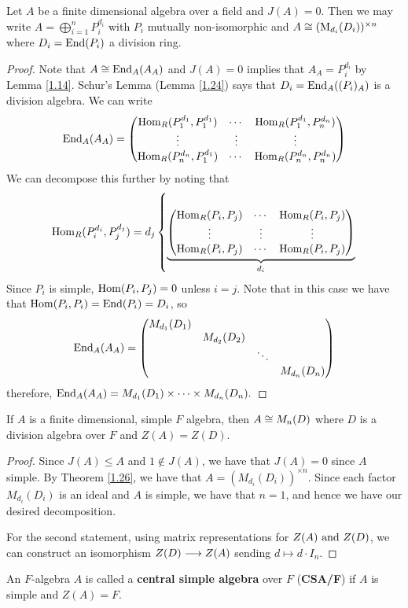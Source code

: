 \begin{theorem}\label{1.27}
Let $A$ be a finite dimensional algebra over a field and $J(A) = 0$. Then we may write $A = \bigoplus_{i=1}^n P_i^{d_i}$ with $P_i$ mutually non-isomorphic and $A \cong (\operatorname{M}_{d_i}(D_i))^{\times n}$ where $D_i = \operatorname{End} (P_i)$ a division ring.
\end{theorem}
\begin{proof}
Note that $A \cong \operatorname{End}_A(A_A)$ and $J(A) = 0$ implies that $A_A = P_i^{d_i}$ by Lemma \ref{1.14}. Schur's Lemma (Lemma \ref{1.24}) says that $D_i = \operatorname{End}_A((P_i)_A)$ is a division algebra. We can write
$$\operatorname{End}_A(A_A) = \begin{pmatrix}
\operatorname{Hom}_R(P_1^{d_1},P_1^{d_1}) & \cdots & \operatorname{Hom}_R(P_1^{d_1},P_n^{d_n}) \\
\vdots & \vdots & \vdots \\
\operatorname{Hom}_R(P_n^{d_n},P_1^{d_1}) & \cdots & \operatorname{Hom}_R(P_n^{d_n},P_n^{d_n})
\end{pmatrix}$$
We can decompose this further by noting that 
$$\operatorname{Hom}_R(P_i^{d_i},P_j^{d_j}) = d_j \left\lbrace \underbrace{\begin{pmatrix}
\operatorname{Hom}_R(P_i,P_j) & \cdots & \operatorname{Hom}_R(P_i,P_j) \\
\vdots & \vdots & \vdots \\
\operatorname{Hom}_R(P_i,P_j) & \cdots & \operatorname{Hom}_R(P_i,P_j)
\end{pmatrix}}_{d_i}\right.$$
Since $P_i$ is simple, $\operatorname{Hom}(P_i,P_j) = 0$ unless $i=j$. Note that in this case we have that $\operatorname{Hom}(P_i,P_i) = \operatorname{End}(P_i) = D_i$, so 
$$
\operatorname{End}_A(A_A) = \begin{pmatrix}
M_{d_1}(D_1) & {} & {} & {} \\
{} & M_{d_2}(D_2) & {} & {} \\
{} & {} & \ddots & {} \\
{} & {} & {} & M_{d_n}(D_n)
\end{pmatrix}$$
therefore, $\operatorname{End}_A(A_A) = M_{d_1}(D_1) \times \cdots \times M_{d_n}(D_n).$
\end{proof}

\begin{coro}\label{1.28}
If $A$ is a finite dimensional, simple $F$ algebra, then $A \cong M_n(D)$ where $D$ is a division algebra over $F$ and $Z(A) = Z(D).$
\end{coro}
\begin{proof}
Since $J(A) \leq A$ and $1\notin J(A)$, we have that $J(A) = 0$ since $A$ simple. By Theorem \ref{1.26}, we have that $A = (M_{d_i}(D_i))^{\times n}$. Since each factor $M_{d_i}(D_i)$ is an ideal and $A$ is simple, we have that $n=1$, and hence we have our desired decomposition.

For the second statement, using matrix representations for $Z(A) \text{ and } Z(D)$, we can construct an isomorphism $Z(D) \longrightarrow Z(A)$ sending $d\longmapsto d\cdot I_n$.
\end{proof}
\begin{defn}\label{1.29}
An $F$-algebra $A$ is called a \textbf{central simple algebra} over $F$ (\textbf{CSA/F}) if $A$ is simple and $Z(A) = F$.
\end{defn}
